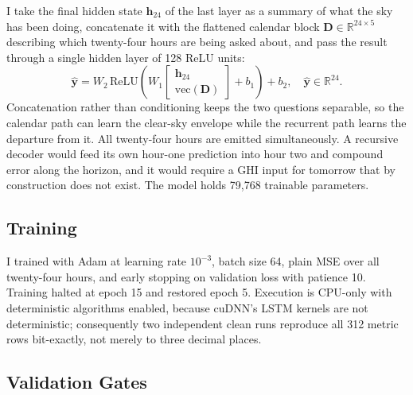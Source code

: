 \documentclass{article}
\begin{document}
I take the final hidden state $\mathbf{h}_{24}$ of the last layer as a summary of
what the sky has been doing, concatenate it with the flattened calendar block
$\mathbf{D} \in \mathbb{R}^{24\times5}$ describing which twenty-four hours are
being asked about, and pass the result through a single hidden layer of 128 ReLU
units:
\begin{equation}
    \hat{\mathbf{y}} = W_2\,\mathrm{ReLU}\!\left(W_1
      \begin{bmatrix}\mathbf{h}_{24} \\ \mathrm{vec}(\mathbf{D})\end{bmatrix}
      + b_1\right) + b_2, \quad \hat{\mathbf{y}} \in \mathbb{R}^{24}.
\end{equation}
Concatenation rather than conditioning keeps the two questions separable, so the
calendar path can learn the clear-sky envelope while the recurrent path learns
the departure from it. All twenty-four hours are emitted simultaneously. A
recursive decoder \cite{sutskever2014sequence} would feed its own hour-one
prediction into hour two and compound error along the horizon, and it would
require a GHI input for tomorrow that by construction does not exist. The model
holds 79{,}768 trainable parameters.

\subsection{Training}

I trained with Adam \cite{kingma2015adam} at learning rate $10^{-3}$, batch size
64, plain MSE over all twenty-four hours, and early stopping on validation loss
with patience 10. Training halted at epoch 15 and restored epoch 5. Execution is
CPU-only with deterministic algorithms enabled, because cuDNN's LSTM kernels are
not deterministic; consequently two independent clean runs reproduce all 312
metric rows bit-exactly, not merely to three decimal places.

\subsection{Validation Gates}
\end{document}
